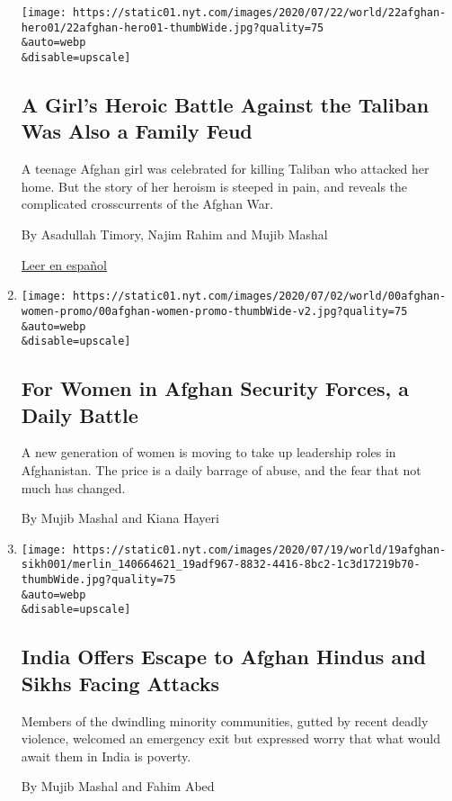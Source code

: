 \begin{enumerate}
  \texttt{[image: https://static01.nyt.com/images/2020/07/22/world/22afghan-hero01/22afghan-hero01-thumbWide.jpg?quality=75\\\&auto=webp\\\&disable=upscale]}

  \hypertarget{a-girls-heroic-battle-against-the-taliban-was-also-a-family-feud}{%
  \subsection{A Girl's Heroic Battle Against the Taliban Was Also a
  Family
  Feud}\label{a-girls-heroic-battle-against-the-taliban-was-also-a-family-feud}}

  A teenage Afghan girl was celebrated for killing Taliban who attacked
  her home. But the story of her heroism is steeped in pain, and reveals
  the complicated crosscurrents of the Afghan War.

  By Asadullah Timory, Najim Rahim and Mujib Mashal

  \href{https://www.nytimes.com/es/2020/07/26/espanol/mundo/guerra-afganistan-mujeres.html}{Leer
  en español}
\item
  \href{/2020/07/20/world/asia/afghanistan-women-police.html}{}

  \texttt{[image: https://static01.nyt.com/images/2020/07/02/world/00afghan-women-promo/00afghan-women-promo-thumbWide-v2.jpg?quality=75\\\&auto=webp\\\&disable=upscale]}

  \hypertarget{for-women-in-afghan-security-forces-a-daily-battle}{%
  \subsection{For Women in Afghan Security Forces, a Daily
  Battle}\label{for-women-in-afghan-security-forces-a-daily-battle}}

  A new generation of women is moving to take up leadership roles in
  Afghanistan. The price is a daily barrage of abuse, and the fear that
  not much has changed.

  By Mujib Mashal and Kiana Hayeri
\item
  \href{/2020/07/19/world/asia/india-afghanistan-sikh-hindu.html}{}

  \texttt{[image: https://static01.nyt.com/images/2020/07/19/world/19afghan-sikh001/merlin\_140664621\_19adf967-8832-4416-8bc2-1c3d17219b70-thumbWide.jpg?quality=75\\\&auto=webp\\\&disable=upscale]}

  \hypertarget{india-offers-escape-to-afghan-hindus-and-sikhs-facing-attacks}{%
  \subsection{India Offers Escape to Afghan Hindus and Sikhs Facing
  Attacks}\label{india-offers-escape-to-afghan-hindus-and-sikhs-facing-attacks}}

  Members of the dwindling minority communities, gutted by recent deadly
  violence, welcomed an emergency exit but expressed worry that what
  would await them in India is poverty.

  By Mujib Mashal and Fahim Abed
\end{enumerate}

